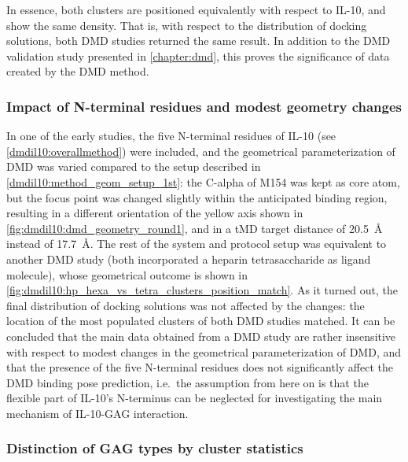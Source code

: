 In essence, both clusters are positioned equivalently with respect to IL-10, and
show the same density. That is, with respect to the distribution of docking
solutions, both DMD studies returned the same result. In addition to the DMD
validation study presented in \cref{chapter:dmd}, this proves the significance
of data created by the DMD method.


\subsubsection{Impact of N-terminal residues and modest geometry changes}

In one of the early studies, the five N-terminal residues of IL-10 (see
\ref{dmdil10:overallmethod}) were included, and the geometrical parameterization
of DMD was varied compared to the setup described in
\ref{dmdil10:method_geom_setup_1st}: the C-alpha of M154 was kept as core atom, but
the focus point was changed slightly within the anticipated binding region,
resulting in a different orientation of the yellow axis shown in
\cref{fig:dmdil10:dmd_geometry_round1}, and in a tMD target distance of
\SI{20.5}{\angstrom} instead of \SI{17.7}{\angstrom}. The rest of the system and
protocol setup was equivalent to another DMD study (both incorporated a heparin
tetrasaccharide as ligand molecule), whose geometrical outcome is shown in
\cref{fig:dmdil10:hp_hexa_vs_tetra_clusters_position_match}. As it turned out,
the final distribution of docking solutions was not affected by the changes: the
location of the most populated clusters of both DMD studies matched. It can be
concluded that the main data obtained from a DMD study are rather insensitive
with respect to modest changes in the geometrical parameterization of DMD, and
that the presence of the five N-terminal residues does not significantly affect
the DMD binding pose prediction, i.e.\ the assumption from here on is that the
flexible part of IL-10's N-terminus can be neglected for investigating the main
mechanism of IL-10-GAG interaction.



\subsubsection{Distinction of GAG types by cluster statistics}

